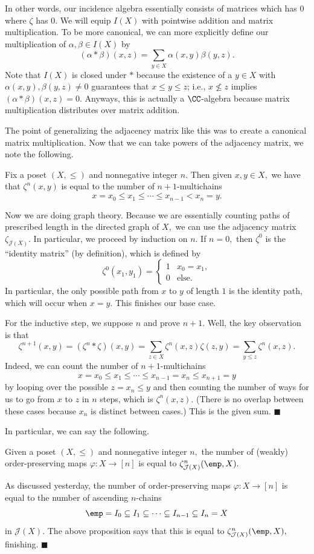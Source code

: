 In other words, our incidence algebra essentially consists of matrices which has $0$ where $\zeta$ has $0.$ We will equip $I(X)$ with pointwise addition and matrix multiplication. To be more canonical, we can more explicitly define our multiplication of $\alpha,\beta\in I(X)$ by
\[(\alpha*\beta)(x,z)=\sum_{y\in X}\alpha(x,y)\beta(y,z).\]
Note that $I(X)$ is closed under $*$ because the existence of a $y\in X$ with $\alpha(x,y),\beta(y,z)\ne0$ guarantees that $x\le y\le z$; i.e., $x\not\le z$ implies $(\alpha*\beta)(x,z)=0.$ Anyways, this is actually a $\CC$-algebra because matrix multiplication distributes over matrix addition.

The point of generalizing the adjacency matrix like this was to create a canonical matrix multiplication. Now that we can take powers of the adjacency matrix, we note the following.
\begin{proposition}
    Fix a poset $(X,\le)$ and nonnegative integer $n.$ Then given $x,y\in X,$ we have that $\zeta^n(x,y)$ is equal to the number of $n+1$-multichains
    \[x=x_0\le x_1\le\cdots\le x_{n-1}<x_n=y.\]
\end{proposition}
Now we are doing graph theory. Because we are essentially counting paths of prescribed length in the directed graph of $X,$ we can use the adjacency matrix $\zeta_{\mathcal J(X)}.$ In particular, we proceed by induction on $n.$ If $n=0,$ then $\zeta^0$ is the ``identity matrix'' (by definition), which is defined by
\[\zeta^0(x_1,y_1)=\begin{cases}
    1 & x_0=x_1, \\
    0 & \text{else}.
\end{cases}\]
In particular, the only possible path from $x$ to $y$ of length $1$ is the identity path, which will occur when $x=y.$ This finishes our base case.

For the inductive step, we suppose $n$ and prove $n+1.$ Well, the key observation is that
\[\zeta^{n+1}(x,y)=\left(\zeta^n*\zeta\right)(x,y)=\sum_{z\in X}\zeta^n(x,z)\zeta(z,y)=\sum_{y\le z}\zeta^n(x,z).\]
Indeed, we can count the number of $n+1$-multichains
\[x=x_0\le x_1\le\cdots\le x_{n-1}=x_n\le x_{n+1}=y\]
by looping over the possible $z=x_n\le y$ and then counting the number of ways for us to go from $x$ to $z$ in $n$ steps, which is $\zeta^n(x,z).$ (There is no overlap between these cases because $x_n$ is distinct between cases.) This is the given sum. $\blacksquare$

In particular, we can say the following.
\begin{proposition}
    Given a poset $(X,\le)$ and nonnegative integer $n,$ the number of (weakly) order-preserving maps $\varphi:X\to[n]$ is equal to $\zeta^n_{\mathcal J(X)}(\emp,X).$
\end{proposition}
As discussed yesterday, the number of order-preserving maps $\varphi:X\to[n]$ is equal to the number of ascending $n$-chains
\[\emp=I_0\subseteq I_1\subseteq\cdots\subseteq I_{n-1}\subseteq I_n=X\]
in $\mathcal J(X).$ The above proposition says that this is equal to $\zeta_{\mathcal J(X)}^n(\emp,X),$ finishing. $\blacksquare$

